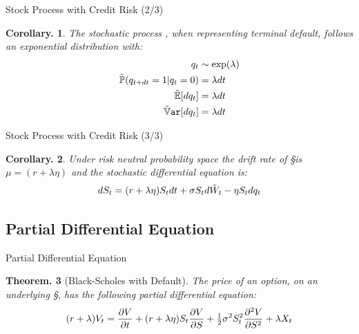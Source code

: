 \documentclass{beamer}
\newtheorem{thm}{Theorem.}
\newtheorem{cor}[thm]{Corollary.}
\begin{document}
\begin{frame}{Stock Process with Credit Risk (2/3)}
\begin{cor}
The stochastic process \q, when representing terminal default, follows an exponential distribution with:
\begin{align}
 \q                       &\sim \exp(\lambda) \\
 \Prob(\qdt = 1 | \q = 0) &= \lambda\dt \\
 \E[\dq]                  &= \lambda\dt \\
 \Var[\dq]                &= \lambda\dt
\end{align}
\end{cor}
\end{frame}

\begin{frame}{Stock Process with Credit Risk (3/3)}
\begin{cor}
Under risk neutral probability space the drift rate of \S is $\mu = (r + \lambda\eta)$ and the stochastic differential equation is:
\begin{equation}
 dS_t = (r + \lambda\eta)S_tdt + \sigma S_td\tilde{W}_t - \eta S_tdq_t
\end{equation}
\end{cor}
\end{frame}


\subsection{Partial Differential Equation}

\begin{frame}{Partial Differential Equation}
\begin{thm}[Black-Scholes with Default]
The price of an option, on an underlying \S, has the following partial differential equation:
\begin{equation}
 (r + \lambda)V_t = \frac{\partial V}{\partial t} + (r + \lambda\eta)S_t\frac{\partial V}{\partial S} + \tfrac{1}{2}\sigma^2S_t^2\frac{\partial^2 V}{\partial S^2} + \lambda X_t \label{eq:BScr}
\end{equation}
\end{thm}
\end{frame}
\end{document}
